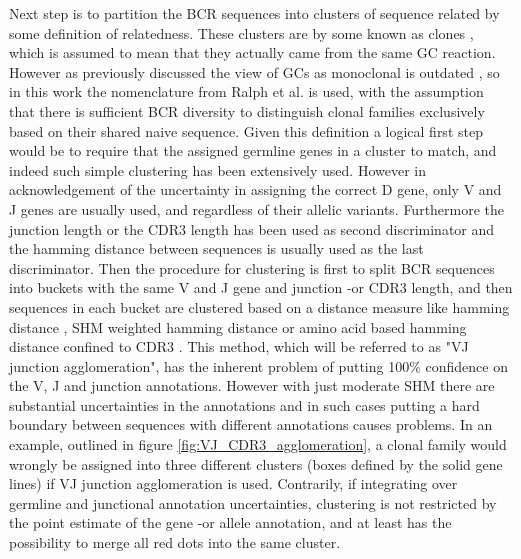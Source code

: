 Next step is to partition the BCR sequences into clusters of sequence related by some definition of relatedness.
These clusters are by some known as clones \cite{gupta2017hierarchical}, which is assumed to mean that they actually came from the same GC reaction.
However as previously discussed the view of GCs as monoclonal is outdated \cite{tas2016visualizing}, so in this work the nomenclature from Ralph et al. \cite{ralph2016likelihood} is used, with the assumption that there is sufficient BCR diversity to distinguish clonal families exclusively based on their shared naive sequence.
Given this definition a logical first step would be to require that the assigned germline genes in a cluster to match, and indeed such simple clustering has been extensively used.
However in acknowledgement of the uncertainty in assigning the correct D gene, only V and J genes are usually used, and regardless of their allelic variants.
Furthermore the junction length or the CDR3 length has been used as second discriminator and the hamming distance between sequences is usually used as the last discriminator.
Then the procedure for clustering is first to split BCR sequences into buckets with the same V and J gene and junction -or CDR3 length, and then sequences in each bucket are clustered based on a distance measure like hamming distance \cite{glanville2011naive}, SHM weighted hamming distance \cite{gupta2017hierarchical} or amino acid based hamming distance confined to CDR3 \cite{jiang2013lineage}.
This method, which will be referred to as "VJ junction agglomeration", has the inherent problem of putting 100\% confidence on the V, J and junction annotations.
However with just moderate SHM there are substantial uncertainties in the annotations and in such cases putting a hard boundary between sequences with different annotations causes problems.
In an example, outlined in figure \ref{fig:VJ_CDR3_agglomeration}, a clonal family would wrongly be assigned into three different clusters (boxes defined by the solid gene lines) if VJ junction agglomeration is used.
Contrarily, if integrating over germline and junctional annotation uncertainties, clustering is not restricted by the point estimate of the gene -or allele annotation, and at least has the possibility to merge all red dots into the same cluster.

